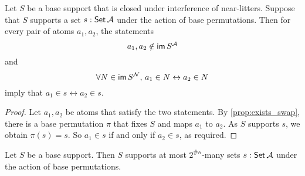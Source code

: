 \begin{proposition}
  \label{prop:supports_atoms_iff}
  Let \( S \) be a base support that is closed under interference of near-litters.
  Suppose that \( S \) supports a set \( s : \operatorname{\mathsf{Set}} {\mathcal A} \) under the action of base permutations.
  Then for every pair of atoms \( a_1, a_2 \), the statements
  \[ a_1, a_2 \notin \operatorname{\mathsf{im}} S^{\mathcal A} \]
  and
  \[ \forall N \in \operatorname{\mathsf{im}} S^{\mathcal N},\, a_1 \in N \leftrightarrow a_2 \in N \]
  imply that \( a_1 \in s \leftrightarrow a_2 \in s \).
\end{proposition}
\begin{proof}
  Let \( a_1, a_2 \) be atoms that satisfy the two statements.
  By \cref{prop:exists_swap}, there is a base permutation \( \pi \) that fixes \( S \) and maps \( a_1 \) to \( a_2 \).
  As \( S \) supports \( s \), we obtain \( \pi(s) = s \).
  So \( a_1 \in s \) if and only if \( a_2 \in s \), as required.
\end{proof}
\begin{proposition}
  \label{prop:card_supports_atoms}
  Let \( S \) be a base support.
  Then \( S \) supports at most \( 2^{\#\kappa} \)-many sets \( s : \operatorname{\mathsf{Set}} {\mathcal A} \) under the action of base permutations.
\end{proposition}

